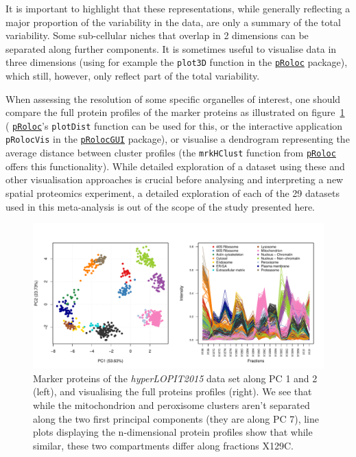 \documentclass[12pt]{article}\usepackage[]{graphicx}\usepackage[]{color}
\makeatletter
\def\maxwidth{ %
  \ifdim\Gin@nat@width>\linewidth
    \linewidth
  \else
    \Gin@nat@width
  \fi
}
\newenvironment{knitrout}{}{} %
\newcommand{\Rpackage}[1]{\texttt{#1}}
\newcommand\Biocpkg[1]{%
  {\href{http://bioconductor.org/packages/#1}%
    {\Rpackage{#1}}}}
\makeatother
\begin{document}
\bigskip

It is important to highlight that these representations, while
generally reflecting a major proportion of the variability in the
data, are only a summary of the total variability. Some sub-cellular
niches that overlap in 2 dimensions can be separated along further
components. It is sometimes useful to visualise data in three
dimensions (using for example the \texttt{plot3D} function in the
\Biocpkg{pRoloc} package), which still, however, only reflect part of
the total variability.

When assessing the resolution of some specific organelles of interest,
one should compare the full protein profiles of the marker proteins as
illustrated on figure~\ref{fig:plotDist} (\Biocpkg{pRoloc}'s
\texttt{plotDist} function can be used for this, or the interactive
application \texttt{pRolocVis} in the \Biocpkg{pRolocGUI} package), or
visualise a dendrogram representing the average distance between
cluster profiles (the \texttt{mrkHClust} function from
\Biocpkg{pRoloc} offers this functionality). While detailed
exploration of a dataset using these and other visualisation
approaches is crucial before analysing and interpreting a new spatial
proteomics experiment, a detailed exploration of each of the
29 datasets used in this meta-analysis is out of the
scope of the study presented here.

\begin{figure}
  \centering
\begin{knitrout}
\color{fgcolor}
\includegraphics[width=\maxwidth]{figure/plotDist-1} 

\end{knitrout}
  \caption{Marker proteins of the \textit{hyperLOPIT2015} data set
    along PC 1 and 2 (left), and visualising the full proteins
    profiles (right). We see that while the mitochondrion and
    peroxisome clusters aren't separated along the two first principal
    components (they are along PC 7), line plots displaying the
    n-dimensional protein profiles show that while similar, these two
    compartments differ along fractions X129C.}
  \label{fig:plotDist}
\end{figure}
\end{document}
